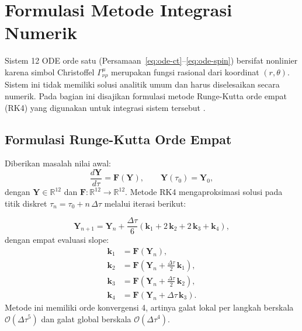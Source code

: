 
\section{Formulasi Metode Integrasi Numerik}
\label{sec:metode-numerik}

Sistem 12 ODE orde satu (Persamaan~\ref{eq:ode-ct}--\ref{eq:ode-spin})
bersifat nonlinier karena simbol Christoffel $\Gamma^\mu_{\nu\rho}$
merupakan fungsi rasional dari koordinat $(r, \theta)$.
Sistem ini tidak memiliki solusi analitik umum dan harus diselesaikan
secara numerik.
Pada bagian ini disajikan formulasi metode Runge-Kutta orde empat (RK4)
yang digunakan untuk integrasi sistem tersebut
\parencite{Butcher2016NumericalMethods}.


\subsection{Formulasi Runge-Kutta Orde Empat}
\label{subsec:rk4}

Diberikan masalah nilai awal:
\begin{equation}
    \frac{d\mathbf{Y}}{d\tau} = \mathbf{F}(\mathbf{Y}),
    \qquad \mathbf{Y}(\tau_0) = \mathbf{Y}_0,
    \label{eq:ivp}
\end{equation}
dengan $\mathbf{Y} \in \mathbb{R}^{12}$ dan $\mathbf{F}: \mathbb{R}^{12} \to \mathbb{R}^{12}$.
Metode RK4 mengaproksimasi solusi pada titik diskret
$\tau_n = \tau_0 + n\,\Delta\tau$ melalui iterasi berikut:

\begin{equation}
    \boxed{
    \mathbf{Y}_{n+1} = \mathbf{Y}_n
    + \frac{\Delta\tau}{6}\left(\mathbf{k}_1 + 2\,\mathbf{k}_2
    + 2\,\mathbf{k}_3 + \mathbf{k}_4\right),
    }
    \label{eq:rk4-update}
\end{equation}
dengan empat evaluasi slope:
\begin{align}
    \mathbf{k}_1 &= \mathbf{F}\!\left(\mathbf{Y}_n\right),
    \label{eq:k1} \\[6pt]
    \mathbf{k}_2 &= \mathbf{F}\!\left(\mathbf{Y}_n
        + \frac{\Delta\tau}{2}\,\mathbf{k}_1\right),
    \label{eq:k2} \\[6pt]
    \mathbf{k}_3 &= \mathbf{F}\!\left(\mathbf{Y}_n
        + \frac{\Delta\tau}{2}\,\mathbf{k}_2\right),
    \label{eq:k3} \\[6pt]
    \mathbf{k}_4 &= \mathbf{F}\!\left(\mathbf{Y}_n
        + \Delta\tau\,\mathbf{k}_3\right).
    \label{eq:k4}
\end{align}
Metode ini memiliki orde konvergensi 4, artinya galat lokal
per langkah berskala $\mathcal{O}(\Delta\tau^5)$ dan galat global
berskala $\mathcal{O}(\Delta\tau^4)$.

